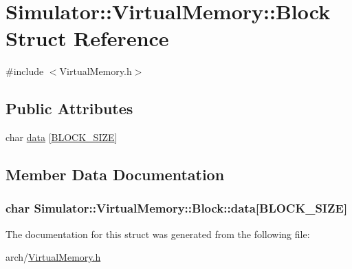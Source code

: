 \hypertarget{struct_simulator_1_1_virtual_memory_1_1_block}{\section{Simulator\+:\+:Virtual\+Memory\+:\+:Block Struct Reference}
\label{struct_simulator_1_1_virtual_memory_1_1_block}
}


{\ttfamily \#include $<$Virtual\+Memory.\+h$>$}

\subsection*{Public Attributes}
\begin{DoxyCompactItemize}
\item 
char \hyperlink{struct_simulator_1_1_virtual_memory_1_1_block_a1094eb796a623c4af0fb66363db171f1}{data} \mbox{[}\hyperlink{class_simulator_1_1_virtual_memory_a84e20b875917ceb9a44d32cfb2d59246}{B\+L\+O\+C\+K\+\_\+\+S\+I\+Z\+E}\mbox{]}
\end{DoxyCompactItemize}


\subsection{Member Data Documentation}
\hypertarget{struct_simulator_1_1_virtual_memory_1_1_block_a1094eb796a623c4af0fb66363db171f1}{
\subsubsection[{data}]{\setlength{\rightskip}{0pt plus 5cm}char Simulator\+::\+Virtual\+Memory\+::\+Block\+::data\mbox{[}{\bf B\+L\+O\+C\+K\+\_\+\+S\+I\+Z\+E}\mbox{]}}}\label{struct_simulator_1_1_virtual_memory_1_1_block_a1094eb796a623c4af0fb66363db171f1}


The documentation for this struct was generated from the following file\+:\begin{DoxyCompactItemize}
\item 
arch/\hyperlink{_virtual_memory_8h}{Virtual\+Memory.\+h}\end{DoxyCompactItemize}
